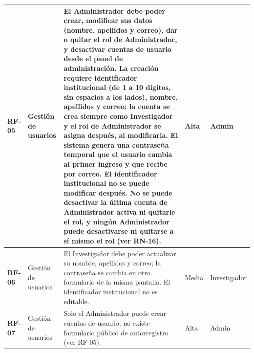 \begin{longtable}{|>{\bfseries}p{1.1cm}|>{\raggedright}p{2.8cm}|>{\raggedright\arraybackslash}p{5.7cm}|p{1.3cm}|p{2.2cm}|}
RF-05 & Gestión de usuarios
      & El Administrador debe poder crear, modificar sus datos (nombre, apellidos y
        correo), dar o quitar el rol de Administrador, y desactivar cuentas de usuario
        desde el panel de administración.
        La creación requiere identificador institucional (de 1 a 10 dígitos, sin espacios a los lados),
        nombre, apellidos y correo; la cuenta se crea siempre como Investigador y el rol de Administrador se asigna
        después, al modificarla. El sistema genera una contraseña temporal que el
        usuario cambia al primer ingreso y que recibe por correo. El identificador
        institucional no se puede modificar después. No se puede desactivar la última cuenta de
        Administrador activa ni quitarle el rol, y ningún Administrador puede desactivarse
        ni quitarse a sí mismo el rol (ver RN-16).
      & Alta & Admin \\
\hline
RF-06 & Gestión de usuarios
      & El Investigador debe poder actualizar su nombre, apellidos y correo; la
        contraseña se cambia en otro formulario de la misma pantalla. El identificador
        institucional no es editable.
      & Media & Investigador \\
\hline
RF-07 & Gestión de usuarios
      & Solo el Administrador puede crear cuentas de usuario; no existe formulario
        público de autorregistro (ver RF-05).
      & Alta & Admin \\
\hline


\end{longtable}
